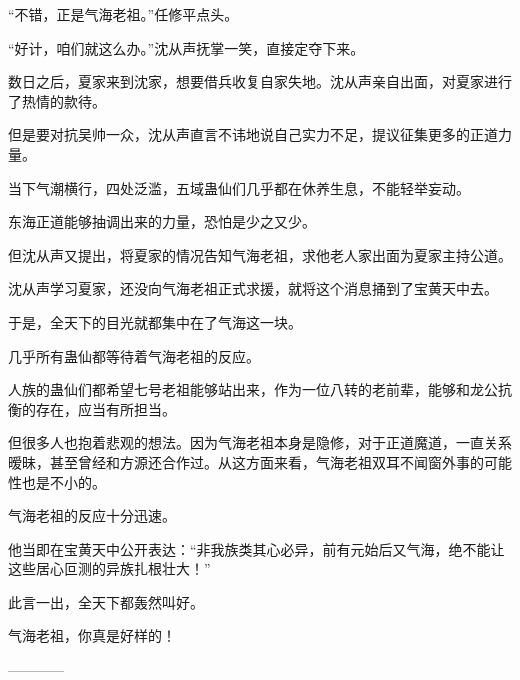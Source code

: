 \begin{this_body}
“不错，正是气海老祖。”任修平点头。

“好计，咱们就这么办。”沈从声抚掌一笑，直接定夺下来。

数日之后，夏家来到沈家，想要借兵收复自家失地。沈从声亲自出面，对夏家进行了热情的款待。

但是要对抗吴帅一众，沈从声直言不讳地说自己实力不足，提议征集更多的正道力量。

当下气潮横行，四处泛滥，五域蛊仙们几乎都在休养生息，不能轻举妄动。

东海正道能够抽调出来的力量，恐怕是少之又少。

但沈从声又提出，将夏家的情况告知气海老祖，求他老人家出面为夏家主持公道。

沈从声学习夏家，还没向气海老祖正式求援，就将这个消息捅到了宝黄天中去。

于是，全天下的目光就都集中在了气海这一块。

几乎所有蛊仙都等待着气海老祖的反应。

人族的蛊仙们都希望七号老祖能够站出来，作为一位八转的老前辈，能够和龙公抗衡的存在，应当有所担当。

但很多人也抱着悲观的想法。因为气海老祖本身是隐修，对于正道魔道，一直关系暧昧，甚至曾经和方源还合作过。从这方面来看，气海老祖双耳不闻窗外事的可能性也是不小的。

气海老祖的反应十分迅速。

他当即在宝黄天中公开表达：“非我族类其心必异，前有元始后又气海，绝不能让这些居心叵测的异族扎根壮大！”

此言一出，全天下都轰然叫好。

气海老祖，你真是好样的！

------------

\end{this_body}

